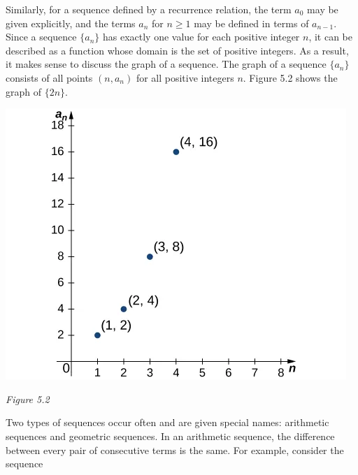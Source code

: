 \documentclass{report}
\begin{document}
    \bigbreak \noindent 
    \bigbreak \noindent 
    \begin{minipage}[t]{0.52\textwidth}
        Similarly, for a sequence defined by a recurrence relation, the term $a_0$ may be given explicitly, and the terms $a_n$ for $n \geq 1$ may be defined in terms of $a_{n-1}$. Since a sequence $\{a_n\}$ has exactly one value for each positive integer $n$, it can be described as a function whose domain is the set of positive integers. As a result, it makes sense to discuss the graph of a sequence. The graph of a sequence $\{a_n\}$ consists of all points $(n, a_n)$ for all positive integers $n$. Figure 5.2 shows the graph of $\{2n\}$.
    \end{minipage}
    \begin{minipage}[t]{0.47\textwidth}
         \begin{center}
            \includegraphics[scale=0.5]{./figures/mane6.png}
        \end{center}
        \begin{center}
            \textit{Figure 5.2}
        \end{center}
    \end{minipage}
    \bigbreak \noindent 
    Two types of sequences occur often and are given special names: arithmetic sequences and geometric sequences. In an arithmetic sequence, the difference between every pair of consecutive terms is the same. For example, consider the sequence
\end{document}
